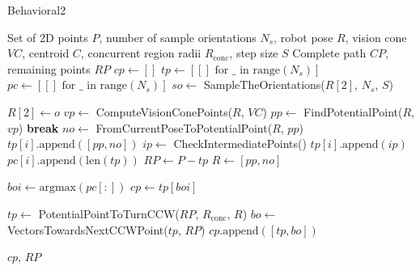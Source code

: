 \begin{algorithm}[H]
    \caption{Behavioral2}
    \label{alg:behavioral2}
    \begin{algorithmic}[1]
    \Require Set of 2D points $P$, number of sample orientations $N_s$, robot pose $R$, vision cone $VC$, centroid $C$, concurrent region radii $R_{\text{conc}}$, step size $S$
    \Ensure Complete path $CP$, remaining points $RP$
    \State $cp \leftarrow []$
    \State $tp \leftarrow [[] \text{ for } \_ \text{ in range}(N_s)]$
    \State $pc \leftarrow [[] \text{ for } \_ \text{ in range}(N_s)]$
    \State $so \leftarrow$ SampleTheOrientations($R[2]$, $N_s$, $S$)
    
        \State $R[2] \leftarrow o$
            \State $vp \leftarrow$ ComputeVisionConePoints($R$, $VC$)
            \State $pp \leftarrow$ FindPotentialPoint($R$, $vp$)
                \State \textbf{break}
            \EndIf
            \State $no \leftarrow$ FromCurrentPoseToPotentialPoint($R$, $pp$)
            \State $tp[i].\text{append}([pp, no])$
            \State $ip \leftarrow$ CheckIntermediatePoints()
            \State $tp[i].\text{append}(ip)$
            \State $pc[i].\text{append}(\text{len}(tp))$
            \State $RP \leftarrow P - tp$
            \State $R \leftarrow [pp, no]$
        \EndWhile
    \EndFor
    
    \State $boi \leftarrow \text{argmax}(pc[:])$
    \State $cp \leftarrow tp[boi]$
    
    \State $tp \leftarrow$ PotentialPointToTurnCCW($RP$, $R_{\text{conc}}$, $R$)
    \State $bo \leftarrow$ VectorsTowardsNextCCWPoint($tp$, $RP$)
    \State $cp.\text{append}([tp, bo])$
    
    \State \Return $cp$, $RP$
    \end{algorithmic}
    \end{algorithm}
    
